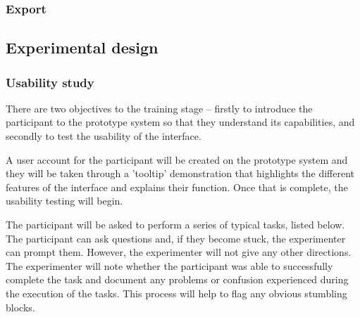 \subsubsection{Export}

\subsection{Experimental design}
\subsubsection{Usability study}
There are two objectives to the training stage – firstly to introduce the
participant to the prototype system so that they understand its capabilities,
and secondly to test the usability of the interface.

A user account for the participant will be created on the prototype system and
they will be taken through a 'tooltip' demonstration that highlights the
different features of the interface and explains their function. Once that is
complete, the usability testing will begin.

The participant will be asked to perform a series of typical tasks, listed
below. The participant can ask questions and, if they become stuck, the
experimenter can prompt them. However, the experimenter will not give any other
directions. The experimenter will note whether the participant was able to
successfully complete the task and document any problems or confusion
experienced during the execution of the tasks. This process will help to flag
any obvious stumbling blocks.

